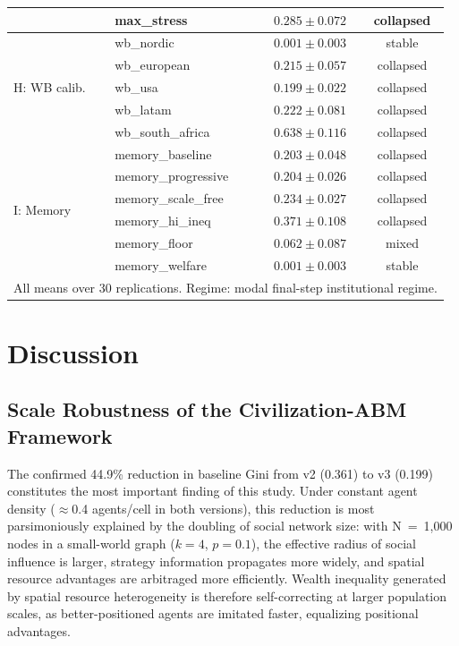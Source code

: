 \documentclass[12pt, letterpaper]{article}
\begin{document}
\begin{table}[h]
\begin{tabular}{llcc}
  & max\_stress           & $0.285 \pm 0.072$ & collapsed \\
\midrule
\multirow{5}{*}{H: WB calib.}
  & wb\_nordic        & $0.001 \pm 0.003$ & stable \\
  & wb\_european      & $0.215 \pm 0.057$ & collapsed \\
  & wb\_usa           & $0.199 \pm 0.022$ & collapsed \\
  & wb\_latam         & $0.222 \pm 0.081$ & collapsed \\
  & wb\_south\_africa & $0.638 \pm 0.116$ & collapsed \\
\midrule
\multirow{6}{*}{I: Memory}
  & memory\_baseline      & $0.203 \pm 0.048$ & collapsed \\
  & memory\_progressive   & $0.204 \pm 0.026$ & collapsed \\
  & memory\_scale\_free   & $0.234 \pm 0.027$ & collapsed \\
  & memory\_hi\_ineq      & $0.371 \pm 0.108$ & collapsed \\
  & memory\_floor         & $0.062 \pm 0.087$ & mixed \\
  & memory\_welfare       & $0.001 \pm 0.003$ & stable \\
\bottomrule
\multicolumn{4}{l}{\small All means over 30 replications. Regime: modal final-step institutional regime.}
\end{tabular}
\end{table}


\section{Discussion}

\subsection{Scale Robustness of the Civilization-ABM Framework}

The confirmed 44.9\% reduction in baseline Gini from v2 (0.361) to
v3 (0.199) constitutes the most important finding of this study. Under
constant agent density ($\approx$0.4 agents/cell in both versions),
this reduction is most parsimoniously explained by the doubling of
social network size: with N~=~1,000 nodes in a small-world graph
($k = 4$, $p = 0.1$), the effective radius of social influence is
larger, strategy information propagates more widely, and spatial
resource advantages are arbitraged more efficiently. Wealth inequality
generated by spatial resource heterogeneity is therefore self-correcting
at larger population scales, as better-positioned agents are imitated
faster, equalizing positional advantages.
\end{document}
